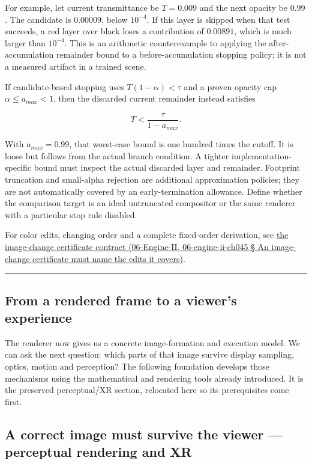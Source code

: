 For example, let current transmittance be \(T=0.009\) and the next opacity be \(0.99\). The candidate is \(0.00009\), below \(10^{-4}\). If this layer is skipped when that test succeeds, a red layer over black loses a contribution of \(0.00891\), which is much larger than \(10^{-4}\). This is an arithmetic counterexample to applying the after-accumulation remainder bound to a before-accumulation stopping policy; it is not a measured artifact in a trained scene.

If candidate-based stopping uses \(T(1-\alpha)<\tau\) and a proven opacity cap \(\alpha\le a_{max}<1\), then the discarded current remainder instead satisfies

\[
T<\frac{\tau}{1-a_{max}}.
\]

With \(a_{max}=0.99\), that worst-case bound is one hundred times the cutoff. It is loose but follows from the actual branch condition. A tighter implementation-specific bound must inspect the actual discarded layer and remainder. Footprint truncation and small-alpha rejection are additional approximation policies; they are not automatically covered by an early-termination allowance. Define whether the comparison target is an ideal untruncated compositor or the same renderer with a particular stop rule disabled.

For color edits, changing order and a complete fixed-order derivation, see \href{}{the image-change certificate contract (06-Engine-II, 06-engine-ii-ch045 § An image-change certificate must name the edits it covers)}.

\begin{center}\rule{0.5\linewidth}{0.5pt}\end{center}

\subsection{From a rendered frame to a viewer's experience}\label{from-a-rendered-frame-to-a-viewers-experience}

The renderer now gives us a concrete image-formation and execution model. We can ask the next question: which parts of that image survive display sampling, optics, motion and perception? The following foundation develops those mechanisms using the mathematical and rendering tools already introduced. It is the preserved perceptual/XR section, relocated here so its prerequisites come first.

\subsection{A correct image must survive the viewer --- perceptual rendering and XR}\label{a-correct-image-must-survive-the-viewer-perceptual-rendering-and-xr}


